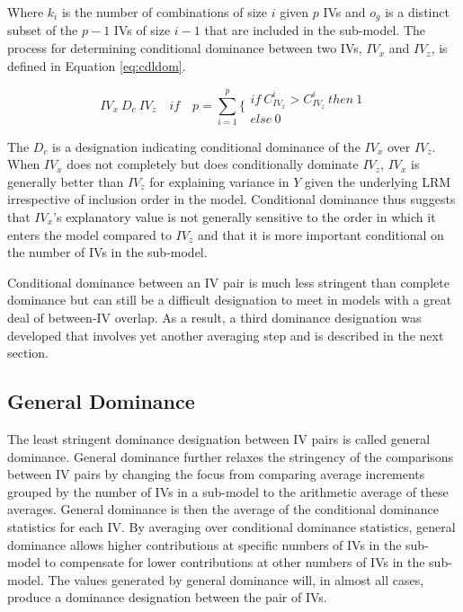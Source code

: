 \documentclass[doc]{apa7}
\begin{document}
	Where $k_i$ is the number of combinations of size $i$ given $p$ IVs and $o_g$ is a distinct subset of the $p-1$ IVs of size $i - 1$ that are included in the sub-model.	
	The process for determining conditional dominance between two IVs, $IV_x$ and $IV_z$, is defined in Equation \ref{eq:cdldom}.
	
	\begin{equation}
		IV_x \ D_c \ IV_z \quad if \quad p = \sum^p_{i=1} \Biggl\{ 
		\begin{array}{l}
			if \ C^{i}_{IV_x} > C^{i}_{IV_z} \ then \ 1 \\ 
			else \ 0 
		\end{array}
		\label{eq:cdldom}
	\end{equation}
	
	The $D_c$ is a designation indicating conditional dominance of the $IV_x$ over $IV_z$.	
	When $IV_x$ does not completely but does conditionally dominate $IV_z$, $IV_x$ is generally better than $IV_z$ for explaining variance in $Y$ given the underlying LRM irrespective of inclusion order in the model.
	Conditional dominance thus suggests that $IV_x$'s explanatory value is not generally sensitive to the order in which it enters the model compared to $IV_z$ and that it is more important conditional on the number of IVs in the sub-model.
	
	Conditional dominance between an IV pair is much less stringent than complete dominance but can still be a difficult designation to meet in models with a great deal of between-IV overlap.
	As a result, a third dominance designation was developed that involves yet another averaging step and is described in the next section.
	
	\subsection{General Dominance}
	
	The least stringent dominance designation between IV pairs is called general dominance.
	General dominance further relaxes the stringency of the comparisons between IV pairs by changing the focus from comparing average increments grouped by the number of IVs in a sub-model to the arithmetic average of these averages.
	General dominance is then the average of the conditional dominance statistics for each IV.
	By averaging over conditional dominance statistics, general dominance allows higher contributions at specific numbers of IVs in the sub-model to compensate for lower contributions at other numbers of IVs in the sub-model. 
	The values generated by general dominance will, in almost all cases, produce a dominance designation between the pair of IVs.
	
\end{document}

